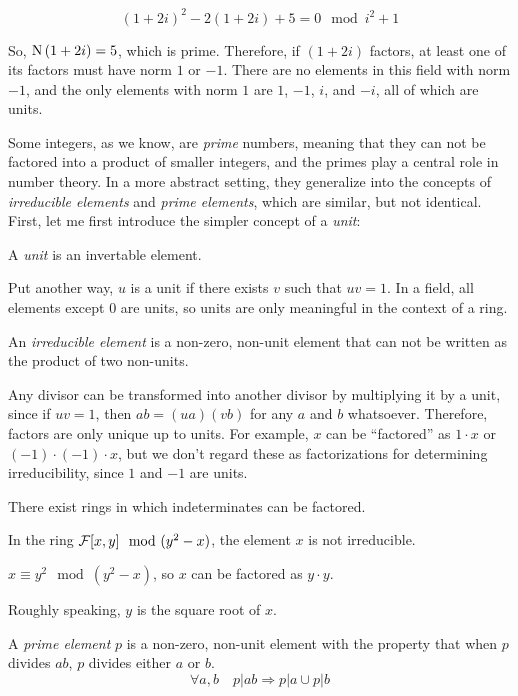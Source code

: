 $$(1+2i)^2 - 2(1+2i) +5 =0 \mod i^2+1$$

So, ${\rm N\,}(1+2i) = 5$, which is prime.  Therefore, if $(1+2i)$ factors,
at least one of its factors must have norm $1$ or $-1$.  There
are no elements in this field with norm $-1$, and the only
elements with norm $1$ are $1$, $-1$, $i$, and $-i$, all
of which are units.

\endexample


\vfill\eject


Some integers, as we know, are {\it prime} numbers, meaning that they
can not be factored into a product of smaller integers, and the primes
play a central role in number theory.  In a more abstract setting,
they generalize into the concepts of {\it irreducible elements} and
{\it prime elements}, which are similar, but not identical.
First, let me
first introduce the simpler concept of a {\it unit}:

\begin{key point}
A {\it unit} is an invertable element.
\end{key point}

Put another way, $u$ is a unit if there exists $v$ such that $uv=1$.
In a field, all elements except 0 are units, so units are only
meaningful in the context of a ring.

\begin{key point}
An {\it irreducible element} is a non-zero, non-unit element
that can not be written as the product of two non-units.
\end{key point}

Any divisor can be transformed into another divisor by multiplying it
by a unit, since if $uv=1$, then $ab=(ua)(vb)$ for any $a$ and $b$
whatsoever.  Therefore, factors are only unique up to units.  For
example, $x$ can be ``factored'' as $1 \cdot x$ or $(-1)\cdot(-1)\cdot x$,
but we don't regard these as factorizations for
determining irreducibility, since $1$ and $-1$ are units.

There exist rings in which indeterminates can be factored.

\example
In the ring ${\cal F}[x,y] \mod (y^2-x)$, the element $x$ is
not irreducible.

$x \equiv y^2 \mod (y^2-x)$, so $x$ can be factored as
$y\cdot y$.

Roughly speaking, $y$ is the square root of $x$.
\endexample

\begin{key point}
A {\it prime element} $p$ is a non-zero, non-unit element with
the property that when $p$ divides $ab$, $p$ divides either $a$ or $b$.
$$\forall a,b \quad p|ab \Rightarrow p|a \cup p|b$$
\end{key point}

